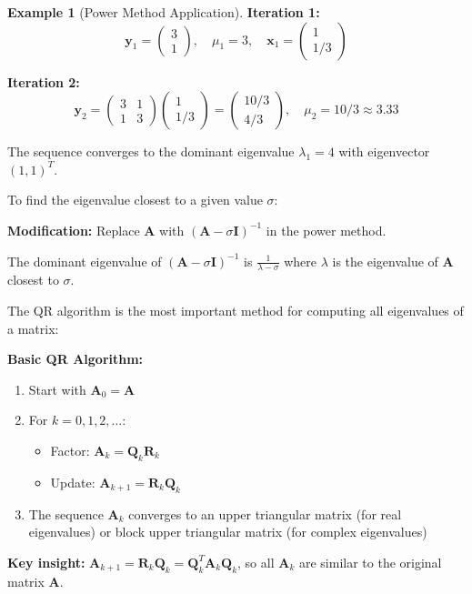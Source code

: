 \documentclass[12pt]{article}
\numberwithin{equation}{section}
\newcommand{\vect}[1]{\boldsymbol{#1}}   %
\newcommand{\mat}[1]{\mathbf{#1}}        %
\theoremstyle{plain}
\theoremstyle{definition}
\newtheorem{example}[theorem]{Example}
\theoremstyle{remark}
\begin{document}
\begin{example}[Power Method Application]
\textbf{Iteration 1:}
$$\vect{y}_1 = \begin{pmatrix} 3 \\ 1 \end{pmatrix}, \quad \mu_1 = 3, \quad \vect{x}_1 = \begin{pmatrix} 1 \\ 1/3 \end{pmatrix}$$

\textbf{Iteration 2:}
$$\vect{y}_2 = \begin{pmatrix} 3 & 1 \\ 1 & 3 \end{pmatrix}\begin{pmatrix} 1 \\ 1/3 \end{pmatrix} = \begin{pmatrix} 10/3 \\ 4/3 \end{pmatrix}, \quad \mu_2 = 10/3 \approx 3.33$$

The sequence converges to the dominant eigenvalue $\lambda_1 = 4$ with eigenvector $(1, 1)^T$.
\end{example}

\begin{algorithm}[H]
\caption{Inverse Power Method}
To find the eigenvalue closest to a given value $\sigma$:

\textbf{Modification:} Replace $\mat{A}$ with $(\mat{A} - \sigma\mat{I})^{-1}$ in the power method.

The dominant eigenvalue of $(\mat{A} - \sigma\mat{I})^{-1}$ is $\frac{1}{\lambda - \sigma}$ where $\lambda$ is the eigenvalue of $\mat{A}$ closest to $\sigma$.
\end{algorithm}

\begin{algorithm}[H]
\caption{QR Algorithm}
The QR algorithm is the most important method for computing all eigenvalues of a matrix:

\textbf{Basic QR Algorithm:}
\begin{enumerate}
\item Start with $\mat{A}_0 = \mat{A}$
\item For $k = 0, 1, 2, \ldots$:
   \begin{itemize}
   \item Factor: $\mat{A}_k = \mat{Q}_k\mat{R}_k$
   \item Update: $\mat{A}_{k+1} = \mat{R}_k\mat{Q}_k$
   \end{itemize}
\item The sequence $\mat{A}_k$ converges to an upper triangular matrix (for real eigenvalues) or block upper triangular matrix (for complex eigenvalues)
\end{enumerate}

\textbf{Key insight:} $\mat{A}_{k+1} = \mat{R}_k\mat{Q}_k = \mat{Q}_k^T\mat{A}_k\mat{Q}_k$, so all $\mat{A}_k$ are similar to the original matrix $\mat{A}$.
\end{algorithm}
\end{document}
